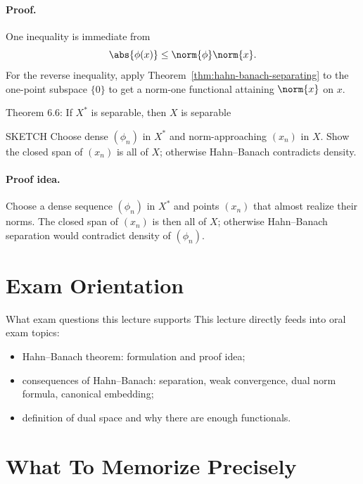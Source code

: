 \documentclass[header={Lecture 3 Exam Study Notes}]{study-note}
\begin{document}
\paragraph{Proof.}
One inequality is immediate from
\[
\abs{\phi(x)}\le \norm{\phi}\norm{x}.
\]
For the reverse inequality, apply Theorem~\ref{thm:hahn-banach-separating} to the one-point subspace $\{0\}$ to get a norm-one functional attaining $\norm{x}$ on $x$.

\begin{thmbox}{Theorem 6.6: If $X^*$ is separable, then $X$ is separable}
\thmDualSeparableImpliesSeparable
\end{thmbox}

\begin{prooflevelbox}{SKETCH}
Choose dense $(\phi_n)$ in $X^*$ and norm-approaching $(x_n)$ in $X$. Show the closed span of $(x_n)$ is all of $X$; otherwise Hahn--Banach contradicts density.
\end{prooflevelbox}

\paragraph{Proof idea.}
Choose a dense sequence $(\phi_n)$ in $X^*$ and points $(x_n)$ that almost realize their norms. The closed span of $(x_n)$ is then all of $X$; otherwise Hahn--Banach separation would contradict density of $(\phi_n)$.

\section{Exam Orientation}

\begin{warningbox}{What exam questions this lecture supports}
This lecture directly feeds into oral exam topics:
\begin{itemize}
\item Hahn--Banach theorem: formulation and proof idea;
\item consequences of Hahn--Banach: separation, weak convergence, dual norm formula, canonical embedding;
\item definition of dual space and why there are enough functionals.
\end{itemize}
\end{warningbox}

\section{What To Memorize Precisely}
\end{document}
